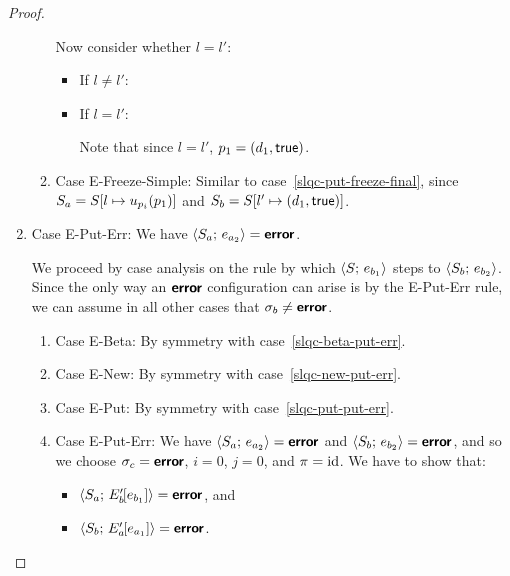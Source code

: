 \begin{proof}
\begin{enumerate}
\begin{enumerate}
      Now consider whether $l = l'$:
      \begin{itemize}
        \item If $l \neq l'$:

          \TODO{}

        \item If $l = l'$:

          Note that since $l = l'$, $p_1 = (d_1, \textsf{true})$.

      \end{itemize}

    \item \label{slqc-put-freeze-simple}Case {\sc E-Freeze-Simple}:
      Similar to case~\ref{slqc-put-freeze-final}, since $S_a =
      S[l \mapsto u_{p_i}(p_1)]$ and $S_b =
      S[l' \mapsto (d_1, \textsf{true})]$.

    \end{enumerate}
  \item Case {\sc E-Put-Err}: We have $\langle S_a;\, e_{a_2} \rangle =
    \textbf{\textsf{error}}$.

    We proceed by case analysis on the rule by which
    $\langle S;\, e_{b_1} \rangle$ steps to $\langle S_b;\, e_{b_2} \rangle$.  Since the
    only way an $\textbf{\textsf{error}}$ configuration can arise is by the {\sc
      E-Put-Err} rule, we can assume in all other cases that $\sigma_b
    \neq \textbf{\textsf{error}}$.
    \begin{enumerate}
    \item \label{slqc-put-err-beta}Case {\sc E-Beta}: By symmetry with case~\ref{slqc-beta-put-err}.
    \item \label{slqc-put-err-new}Case {\sc E-New}: By symmetry with case~\ref{slqc-new-put-err}.
    \item \label{slqc-put-err-put}Case {\sc E-Put}: By symmetry with case~\ref{slqc-put-put-err}.
    \item \label{slqc-put-err-put-err}Case {\sc E-Put-Err}: We have
      $\langle S_a;\, e_{a_2} \rangle = \textbf{\textsf{error}}$ and $\langle S_b;\, e_{b_2} \rangle =
      \textbf{\textsf{error}}$, and so we choose $\sigma_c = \textbf{\textsf{error}}$, $i = 0$, $j = 0$,
      and $\pi = \mathrm{id}$.  We have to show that:
      \begin{itemize}
      \item $\langle S_a;\, E'_b\hspace{-1mm}\left[e_{b_1}\right] \rangle = \textbf{\textsf{error}}$, and
      \item $\langle S_b;\, E'_a\hspace{-1mm}\left[e_{a_1}\right] \rangle = \textbf{\textsf{error}}$.
      \end{itemize}


\end{enumerate}
\end{enumerate}
\end{proof}
